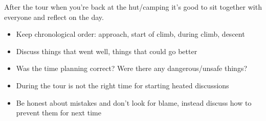 After the tour when you're back at the hut/camping it's good to sit together with everyone and reflect on the day.
\begin{itemize}
\item Keep chronological order: approach, start of climb, during climb, descent
\item Discuss things that went well, things that could go better
\item Was the time planning correct? Were there any dangerous/unsafe things?
\item During the tour is not the right time for starting heated discussions
\item Be honest about mistakes and don't look for blame, instead discuss how to prevent them for next time
\end{itemize}
